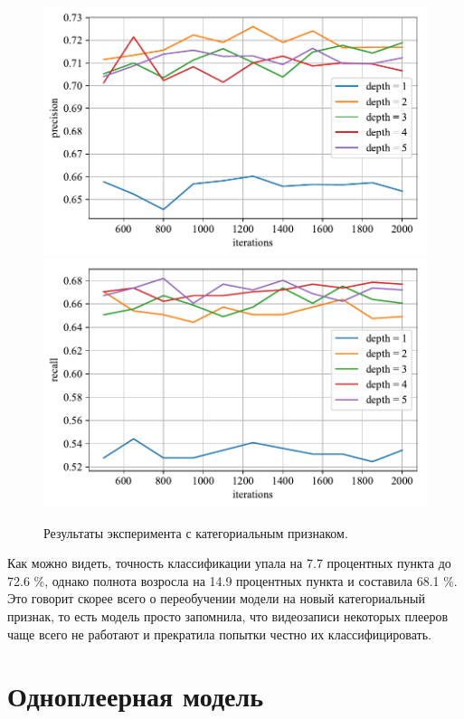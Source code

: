\begin{figure}
    \centering
    \includegraphics{../images/toloka_catboost_with_cat_precision.pdf}
    \includegraphics{../images/toloka_catboost_with_cat_recall.pdf}
    \caption{Результаты эксперимента с категориальным признаком.}
    \label{fig:toloka_catboost_with_cat}
\end{figure}

Как можно видеть, точность классификации упала на 7.7 процентных пункта до 72.6 \%, однако полнота возросла на 14.9 процентных пункта и составила 68.1 \%. Это говорит скорее всего о переобучении модели на новый категориальный признак, то есть модель просто запомнила, что видеозаписи некоторых плееров чаще всего не работают и прекратила попытки честно их классифицировать.

\section{Одноплеерная модель}

